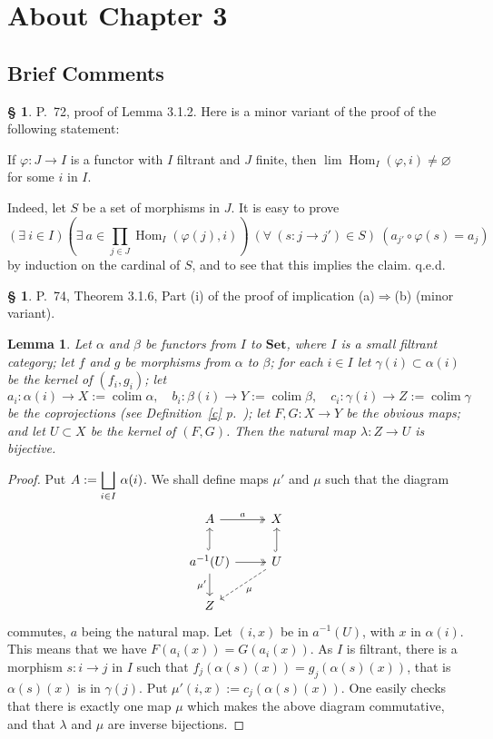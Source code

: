 \documentclass[12pt]{article}%
\newtheorem{lem}[thm]{Lemma}
\theoremstyle{remark}
\theoremstyle{definition}
\newtheorem{s}[thm]{\S}%
\newcommand{\Set}{\mathbf{Set}}
\newcommand{\then}{\Rightarrow}
\DeclareMathOperator*{\colim}{colim}
\DeclareMathOperator{\Hom}{Hom}%
\begin{document}

\section{About Chapter 3}

\subsection{Brief Comments}

\begin{s} 
P.~72, proof of Lemma 3.1.2. Here is a minor variant of the proof of the following statement: 

If $\varphi:J\to I$ is a functor with $I$ filtrant and $J$ finite, then $\lim\Hom_I(\varphi,i)\neq\varnothing$ for some $i$ in $I$. 

Indeed, let $S$ be a set of morphisms in $J$. It is easy to prove 
$$
(\exists\ i\in I)\left(\exists\ a\in\prod_{j\in J}\Hom_I(\varphi(j),i)\right)\ (\forall\ (s:j\to j')\in S)\ (a_{j'}\circ\varphi(s)=a_j) 
$$ 
by induction on the cardinal of $S$, and to see that this implies the claim. q.e.d.
\end{s}

%

\begin{s} 
P.~74, Theorem 3.1.6, Part (i) of the proof of implication (a)$\then$(b) (minor variant). 
%
\begin{lem} 
Let $\alpha$ and $\beta$ be functors from $I$ to $\Set$, where $I$ is a small filtrant category; let $f$ and $g$ be morphisms from $\alpha$ to $\beta$; for each $i\in I$ let $\gamma(i)\subset\alpha(i)$ be the kernel of $(f_i,g_i)$; let 
$$
a_i:\alpha(i)\to X:=\colim\alpha,\quad 
b_i:\beta(i)\to Y:=\colim\beta,\quad 
c_i:\gamma(i)\to Z:=\colim\gamma
$$ 
be the coprojections (see Definition~\ref{c} p.~\pageref{c}); let $F,G:X\to Y$ be the obvious maps; and let $U\subset X$ be the kernel of $(F,G)$. Then the natural map $\lambda:Z\to U$ is bijective.
\end{lem}
%
\begin{proof}
Put $\displaystyle A:=\bigsqcup_{i\in I}\,\alpha(i)$. We shall define maps $\mu'$ and $\mu$ such that the diagram
$$
\begin{tikzcd}
A\ar[two heads]{r}{a}&X\\ 
a^{-1}(U)\ar[hook]{u}\ar{d}[swap]{\mu'}\ar[two heads]{r}&U\ar[hook]{u}\ar[dashed]{dl}{\mu}\\ 
Z
\end{tikzcd}
$$ 
commutes, $a$ being the natural map. Let $(i,x)$ be in $a^{-1}(U)$, with $x$ in $\alpha(i)$. This means that we have $F(a_i(x))=G(a_i(x))$. As $I$ is filtrant, there is a morphism $s:i\to j$ in $I$ such that $f_j(\alpha(s)(x))=g_j(\alpha(s)(x))$, that is $\alpha(s)(x)$ is in $\gamma(j)$. Put $\mu'(i,x):=c_j(\alpha(s)(x))$. One easily checks that there is exactly one map $\mu$ which makes the above diagram commutative, and that $\lambda$ and $\mu$ are inverse bijections.
\end{proof}
\end{s}
\end{document}
